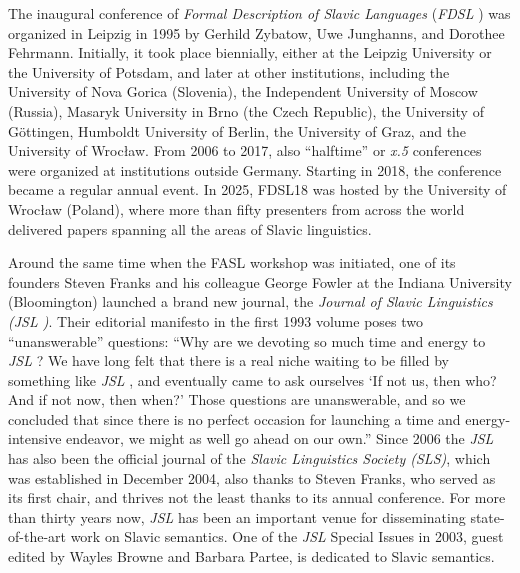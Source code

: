 \documentclass[output=paper]{langscibook}
\begin{document}
The inaugural conference of \textit{%
Formal Description of Slavic Languages} (\textit{FDSL}%
) was organized in Leipzig in 1995 by Gerhild Zybatow, Uwe Junghanns, and Dorothee Fehrmann. Initially, it took place biennially, either at
the Leipzig University or the University of Potsdam, and later at other institutions, 
including the University of Nova Gorica (Slovenia), the Independent University of Moscow (Russia), Masaryk University in Brno (the Czech Republic), the University of Göttingen, Humboldt University of Berlin, the University of Graz, and the University of Wrocław. From 2006 to 2017, 
also ``halftime'' or \textit{x.5} conferences were organized at institutions outside Germany.
Starting in 2018, the conference became a regular annual event.
In 2025, FDSL18 was hosted by the University of Wrocław (Poland), where more than fifty presenters from across the world delivered papers spanning all the areas of Slavic linguistics. 

Around the same time when the FASL %
workshop was initiated, one of its founders 
Steven Franks and his colleague George Fowler at the Indiana University
(Bloomington) launched a brand new journal, 
the \textit{Journal of Slavic Linguistics (JSL%
)}. Their editorial manifesto in the first 1993 volume poses two ``unanswerable'' questions:
``Why are we devoting so much time and energy to \textit{JSL}%
?  We have long felt that there is a real niche waiting to be filled by something like
\textit{JSL}%
, and eventually came to ask ourselves `If not us, then who? And if
not now, then when?' Those questions are unanswerable, and so we
concluded that since there is no perfect occasion for launching a time and
energy-intensive endeavor, we might as well go ahead on our
own.''  Since 2006 the \textit{JSL} %
has also been the official journal of the \textit{Slavic Linguistics 
Society (SLS)}, which was established in December 2004,
also thanks to Steven Franks, who served as its first chair, and 
thrives not the least thanks to its annual conference.
For more than thirty years now, 
\textit{JSL} has been an important venue for disseminating state-of-the-art work on 
Slavic semantics. One of the \textit{JSL} Special Issues in 2003, guest edited by Wayles
Browne and Barbara Partee, is dedicated to Slavic semantics.  
\end{document}
